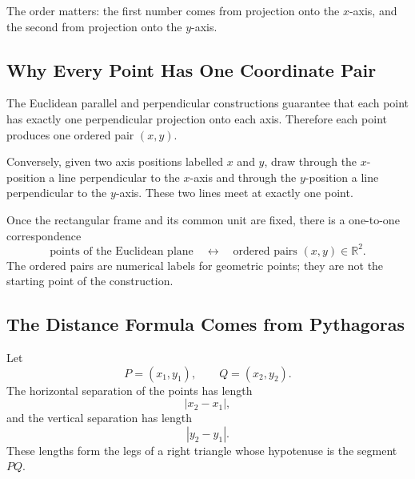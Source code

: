 The order matters: the first number comes from projection onto the $x$-axis,
and the second from projection onto the $y$-axis.

\subsection{Why Every Point Has One Coordinate Pair}

The Euclidean parallel and perpendicular constructions guarantee that each
point has exactly one perpendicular projection onto each axis.  Therefore each
point produces one ordered pair $(x,y)$.

Conversely, given two axis positions labelled $x$ and $y$, draw through the
$x$-position a line perpendicular to the $x$-axis and through the $y$-position
a line perpendicular to the $y$-axis.  These two lines meet at exactly one
point.

\begin{center}
\end{center}

\begin{theorembox}
Once the rectangular frame and its common unit are fixed, there is a one-to-one
correspondence
\[
\boxed{
\text{points of the Euclidean plane}
\quad\longleftrightarrow\quad
\text{ordered pairs }(x,y)\in\mathbb R^2
}.
\]
The ordered pairs are numerical labels for geometric points; they are not the
starting point of the construction.
\end{theorembox}

\subsection{The Distance Formula Comes from Pythagoras}

Let
\[
P=(x_1,y_1),
\qquad
Q=(x_2,y_2).
\]
The horizontal separation of the points has length
\[
|x_2-x_1|,
\]
and the vertical separation has length
\[
|y_2-y_1|.
\]
These lengths form the legs of a right triangle whose hypotenuse is the segment
$PQ$.


